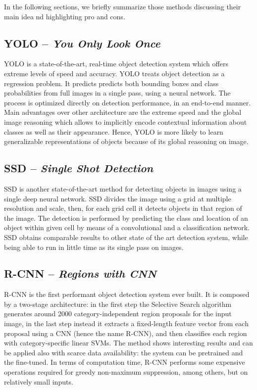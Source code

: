 In the following sections, we briefly summarize those methods
discussing their main idea nd highlighting pro and cons.

\subsection{YOLO -- \emph{You Only Look Once}}
\label{subsec:yolo}

YOLO \cite{redmon2016you} is a state-of-the-art, real-time object
detection system which offers extreme levels of speed and accuracy.
YOLO treats object detection as a regression problem. It predicts
predicts both bounding boxes and class probabilities from full images
in a single pass, using a neural network. The process is optimized
directly on detection performance, in an end-to-end manner. Main
advantages over other architecture are the extreme speed and the
global image reasoning which allows to implicitly encode contextual
information about classes as well as their appearance. Hence, YOLO is
more likely to learn generalizable representations of objects because
of its global reasoning on image.

\subsection{SSD -- \emph{Single Shot Detection}}

SSD \cite{liu2016ssd} is another state-of-the-art method for detecting
objects in images using a single deep neural network. SSD divides the
image using a grid at multiple resolution and scale, then, for each
grid cell it detects objects in that region of the image. The
detection is performed by predicting the class and location of an
object within given cell by means of a convolutional and a
classification network. SSD obtains comparable results to other state
of the art detection system, while being able to run in little time as
its single pass on images. 

\subsection{R-CNN -- \emph{Regions with CNN}}

R-CNN \cite{girshick2014rich} is the first performant object detection
system ever built. It is composed by a two-stage architecture: in the
first step the Selective Search algorithm generates around 2000
category-independent region proposals for the input image, in the last
step instead it extracts a fixed-length feature vector from each
proposal using a CNN (hence the name R-CNN), and then classifies each
region with category-specific linear SVMs. The method shows
interesting results and can be applied also with scarce data
availability: the system can be pretrained and the fine-tuned. In
terms of computation time, R-CNN performs some expensive operations
required for greedy non-maximum suppression, among others, but on
relatively small inputs.

